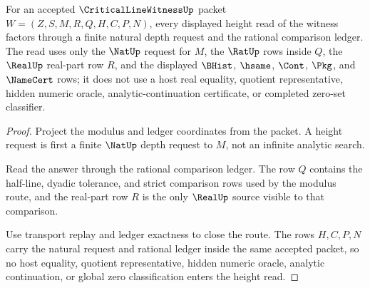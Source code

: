 \begin{theorem}
\label{thm:critical-line-witness-rational-height-ledger}
For an accepted $\CriticalLineWitnessUp$ packet
$W=(Z,S,M,R,Q,H,C,P,N)$, every displayed height read of the witness factors
through a finite natural depth request and the rational comparison ledger. The
read uses only the $\NatUp$ request for $M$, the $\RatUp$ rows inside $Q$, the
$\RealUp$ real-part row $R$, and the displayed $\BHist$, $\hsame$, $\Cont$,
$\Pkg$, and $\NameCert$ rows; it does not use a host real equality, quotient
representative, hidden numeric oracle, analytic-continuation certificate, or
completed zero-set classifier.
\end{theorem}
\begin{proof}
Project the modulus and ledger coordinates from the packet. A height request is
first a finite $\NatUp$ depth request to $M$, not an infinite analytic search.

Read the answer through the rational comparison ledger. The row $Q$ contains the
half-line, dyadic tolerance, and strict comparison rows used by the modulus
route, and the real-part row $R$ is the only $\RealUp$ source visible to that
comparison.

Use transport replay and ledger exactness to close the route. The rows $H,C,P,N$
carry the natural request and rational ledger inside the same accepted packet,
so no host equality, quotient representative, hidden numeric oracle, analytic
continuation, or global zero classification enters the height read.
\end{proof}

